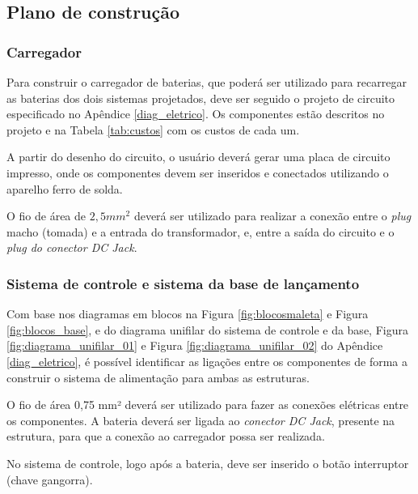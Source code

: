 \subsection{Plano de construção}

\subsubsection{Carregador}

Para construir o carregador de baterias, que poderá ser utilizado para recarregar as baterias dos dois sistemas projetados, deve ser seguido o projeto de circuito especificado no Apêndice \ref{diag_eletrico}. Os componentes estão descritos no projeto e na Tabela \ref{tab:custos} com os custos de cada um. 

A partir do desenho do circuito, o usuário deverá gerar uma placa de circuito impresso, onde os componentes devem ser inseridos e conectados utilizando o aparelho ferro de solda.

O fio de área de $2,5 mm^2$ deverá ser utilizado para realizar a conexão entre o \textit{plug} macho (tomada) e a entrada do transformador, e, entre a saída do circuito e o \textit{plug do conector DC Jack}.

\subsubsection{Sistema de controle e sistema da base de lançamento}

Com base nos diagramas em blocos na Figura \ref{fig:blocosmaleta} e Figura \ref{fig:blocos_base}, e do diagrama unifilar do sistema de controle e da base, Figura \ref{fig:diagrama_unifilar_01} e Figura \ref{fig:diagrama_unifilar_02} do Apêndice \ref{diag_eletrico}, é possível identificar as ligações entre os componentes de forma a construir o sistema de alimentação para ambas as estruturas.


O fio de área 0,75 mm² deverá ser utilizado para fazer as conexões elétricas entre os componentes.  A bateria deverá ser ligada ao \textit{conector DC Jack}, presente na estrutura, para que a conexão ao carregador possa ser realizada.

No sistema de controle, logo após a bateria, deve ser inserido o botão interruptor (chave gangorra). 



